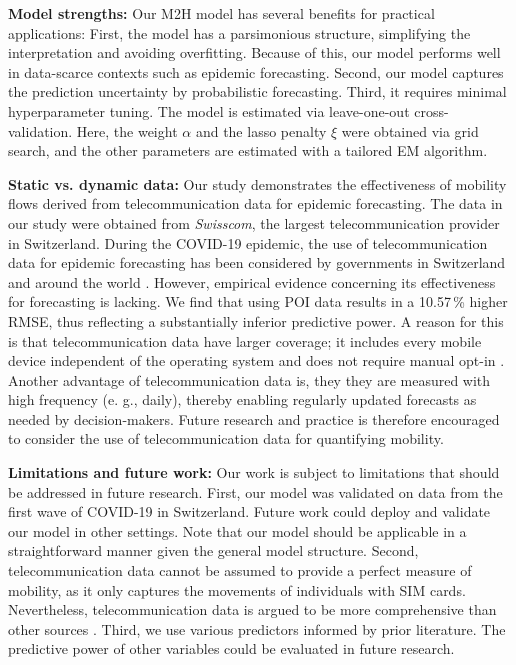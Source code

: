 \documentclass[sigconf, review = false, nonacm = true]{acmart}
\newcommand\model{M2H model\xspace}
\begin{document}
\textbf{Model strengths:} Our \model has several benefits for practical applications: First, the model has a parsimonious structure, simplifying the interpretation and avoiding overfitting. Because of this, our model performs well in data-scarce contexts such as epidemic forecasting. Second, our model captures the prediction uncertainty by probabilistic forecasting. Third, it requires minimal hyperparameter tuning. The model is estimated via leave-one-out cross-validation. Here, the weight $\alpha$ and the lasso penalty $\xi$ were obtained via grid search, and the other parameters are estimated with a tailored EM algorithm.

\textbf{Static vs. dynamic data:} Our study demonstrates the effectiveness of mobility flows derived from telecommunication data for epidemic forecasting. The data in our study were obtained from \emph{Swisscom}, the largest telecommunication provider in Switzerland. During the COVID-19 epidemic, the use of telecommunication data for epidemic forecasting has been considered by governments in Switzerland and around the world \cite{busvine_european_2020}. However, empirical evidence concerning its effectiveness for forecasting is lacking. We find that using POI data results in a 10.57\,\% higher RMSE, thus reflecting a substantially inferior predictive power. A reason for this is that telecommunication data have larger coverage; it includes every mobile device independent of the operating system and does not require manual opt-in \cite{buckee_aggregated_2020}. Another advantage of telecommunication data is, they they are measured with high frequency (e. g., daily), thereby enabling regularly updated forecasts as needed by decision-makers. Future research and practice is therefore encouraged to consider the use of telecommunication data for quantifying mobility.


\textbf{Limitations and future work:} Our work is subject to limitations that should be addressed in future research. First, our model was validated on data from the first wave of COVID-19 in Switzerland. Future work could deploy and validate our model in other settings. Note that our model should be applicable in a straightforward manner given the general model structure. Second, telecommunication data cannot be assumed to provide a perfect measure of mobility, as it only captures the movements of individuals with SIM cards. Nevertheless, telecommunication data is argued to be more comprehensive than other sources \cite{buckee_aggregated_2020, grantz_use_2020}. Third, we use various predictors informed by prior literature. The predictive power of other variables could be evaluated in future research.
\end{document}

